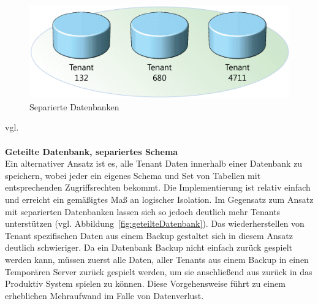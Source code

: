 	\begin{figure}[h]
		\centering
		\includegraphics[width=0.7\linewidth]{images/separierte_datenbanken}
		\caption{Separierte Datenbanken}
		\label{fig:separierteDatenbanken}
	\end{figure}
vgl.	
\\
\\
\textbf{Geteilte Datenbank, separiertes Schema}\\
Ein alternativer Ansatz ist es, alle Tenant Daten innerhalb einer Datenbank zu speichern, wobei jeder ein eigenes Schema und Set von Tabellen mit entsprechenden Zugriffsrechten bekommt.
Die Implementierung ist relativ einfach und erreicht ein gemäßigtes Maß an logischer Isolation. Im Gegensatz zum Ansatz mit separierten Datenbanken lassen sich so jedoch deutlich mehr Tenants unterstützen (vgl. Abbildung~\ref{fig:geteilteDatenbank}). Das wiederherstellen von Tenant spezifischen Daten aus einem Backup gestaltet sich in diesem Ansatz deutlich schwieriger. Da ein Datenbank Backup nicht einfach zurück gespielt werden kann, müssen zuerst alle Daten, aller Tenants aus einem Backup in einen Temporären Server zurück gespielt werden, um sie anschließend aus zurück in das Produktiv System spielen zu können. Diese Vorgehensweise führt zu einem erheblichen Mehraufwand im Falle von Datenverlust.

